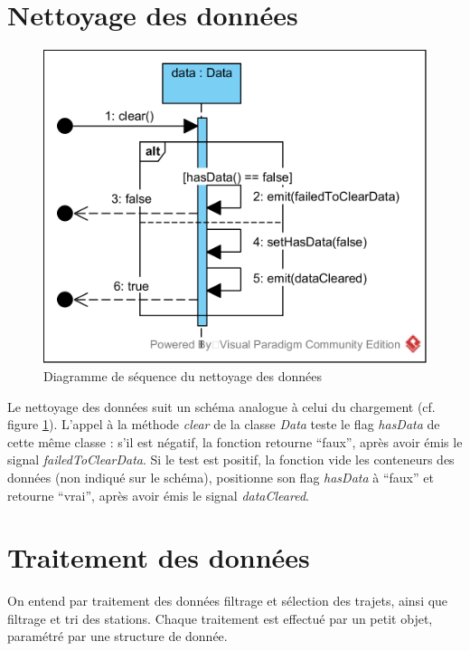 \documentclass[12pt]{article}
\begin{document}
	\section{Nettoyage des données}
	\begin{figure}[!h]
	\begin{center}
	\includegraphics[scale=1]{dia_sequence_clear.png}
	\caption{ Diagramme de séquence du nettoyage des données}
	\label{fig:nettoyage}
	\end{center}
	\end{figure}
	
	Le nettoyage des données suit un schéma analogue à celui du chargement (cf. figure \ref{fig:nettoyage}). L’appel à la méthode \textit{clear} de la classe \textit{Data} teste le flag \textit{hasData} de cette même classe : s’il est négatif, la fonction retourne “faux”, après avoir émis le signal \textit{failedToClearData}. Si le test est positif, la fonction vide les conteneurs des données (non indiqué sur le schéma), positionne son flag \textit{hasData} à “faux” et retourne “vrai”, après avoir émis le signal \textit{dataCleared}.

	\section{Traitement des données}
	On entend par traitement des données filtrage et sélection des trajets, ainsi que filtrage et tri des stations. Chaque traitement est effectué par un petit objet, paramétré par une structure de donnée.
	
\end{document}
